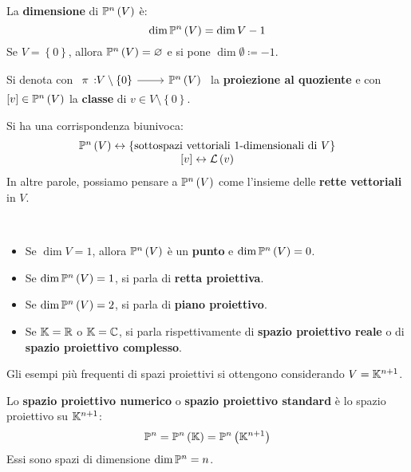 \begin{define}
La \textbf{dimensione} di $\proj{V}$ è:
\begin{equation}
	\dim\proj{V}=\dim V-1
\end{equation}
Se $V=\left\{0\right\}$, allora $\proj{V}=\emptyset$ e si pone $\dim\emptyset\coloneqq -1$.
\end{define}
\begin{define}
Si denota con $\funz{\pi}{V\setminus\left\{0\right\}}{\proj{V}}$ la \textbf{proiezione al quoziente} e con $\left[v\right]\in\proj{V}$ la \textbf{classe} di $v\in V\setminus\left\{0\right\}$.
\end{define}
\begin{observe}
	Si ha una corrispondenza biunivoca:
	\begin{equation}
		\begin{array}{c}
			\proj{V}\leftrightarrow\left\{\text{sottospazi vettoriali }1\text{-dimensionali di }V\right\}\\
			\left[v\right]\leftrightarrow\lin{v}
		\end{array}
	\end{equation}
In altre parole, possiamo pensare a $\proj{V}$ come l'insieme delle \textbf{rette vettoriali} in $V$.
\end{observe}
\begin{define}~{}
	\begin{itemize}
		\item Se $\dim V=1$, allora $\proj{V}$ è un \textbf{punto} e $\dim\proj{V}=0$.
		\item Se $\dim \proj{V}=1$, si parla di \textbf{retta proiettiva}.
		\item Se $\dim \proj{V}=2$, si parla di \textbf{piano proiettivo}.
		\item Se $\mathbb{K}=\mathbb{R}$ o $\mathbb{K}=\mathbb{C}$, si parla rispettivamente di \textbf{spazio proiettivo reale} o di \textbf{spazio proiettivo complesso}.
	\end{itemize}
\end{define}
Gli esempi più frequenti di spazi proiettivi si ottengono considerando $V=\mathbb{K}^{n+1}$.
\begin{define}
	Lo \textbf{spazio proiettivo numerico} o \textbf{spazio proiettivo standard} è lo spazio proiettivo su $\mathbb{K}^{n+1}$:
\begin{equation}
	\proj{\ }=\proj[n]{\kamp}=\proj{\kamp^{n+1}}
\end{equation}
Essi sono spazi di dimensione $\dim\proj[n]{\ }=n$.
\end{define}
